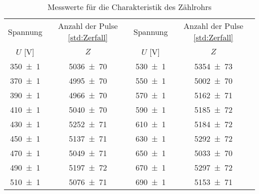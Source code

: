 \begin{table}[!h]
	\centering
	\begin{tabular}{|c|c||c|c|}
		\hline
		Spannung & Anzahl der Pulse \cref{std:Zerfall} & Spannung & Anzahl der Pulse \cref{std:Zerfall}\\
		$U$ [\si{\volt}] & $Z$  & $U$ [\si{\volt}] & $Z$ \\
\hline\hline
		\num{350(1)} & \num{5036(70)} & \num{530(1)} & \num{5354(73)}\\
		\num{370(1)} & \num{4995(70)} & \num{550(1)} & \num{5002(70)}\\
		\num{390(1)} & \num{4966(70)} & \num{570(1)} & \num{5162(71)}\\
		\num{410(1)} & \num{5040(70)} & \num{590(1)} & \num{5185(72)}\\
		\num{430(1)} & \num{5252(71)} & \num{610(1)} & \num{5184(72)}\\
		\num{450(1)} & \num{5137(71)} & \num{630(1)} & \num{5292(72)}\\
		\num{470(1)} & \num{5049(71)} & \num{650(1)} & \num{5033(70)}\\
		\num{490(1)} & \num{5197(72)} & \num{670(1)} & \num{5297(72)}\\
		\num{510(1)} & \num{5076(71)} & \num{690(1)} & \num{5153(71)}\\
		\hline
	\end{tabular}
	\caption{Messwerte für die Charakteristik des Zählrohrs \label{tab:Auswertung_Charakteristik}}
\end{table}
